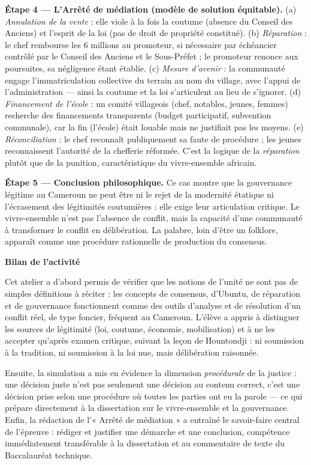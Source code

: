 \documentclass[11pt]{article}
\newcommand{\cle}[1]{{\popxbold\color{popdark}#1}}
\begin{document}
\begin{exoresolu}
\textbf{Étape 4 — L'Arrêté de médiation (modèle de solution équitable).} (a) \emph{Annulation de la vente} : elle viole à la fois la coutume (absence du Conseil des Anciens) et l'esprit de la loi (pas de droit de propriété constitué). (b) \emph{Réparation} : le chef rembourse les 6 millions au promoteur, si nécessaire par échéancier contrôlé par le Conseil des Anciens et le Sous-Préfet ; le promoteur renonce aux poursuites, sa négligence étant établie. (c) \emph{Mesure d'avenir} : la communauté engage l'immatriculation collective du terrain au nom du village, avec l'appui de l'administration — ainsi la coutume et la loi s'articulent au lieu de s'ignorer. (d) \emph{Financement de l'école} : un comité villageois (chef, notables, jeunes, femmes) recherche des financements transparents (budget participatif, subvention communale), car la fin (l'école) était louable mais ne justifiait pas les moyens. (e) \emph{Réconciliation} : le chef reconnaît publiquement sa faute de procédure ; les jeunes reconnaissent l'autorité de la chefferie réformée. C'est la logique de la \emph{réparation} plutôt que de la punition, caractéristique du vivre-ensemble africain.

\textbf{Étape 5 — Conclusion philosophique.} Ce cas montre que la gouvernance légitime au Cameroun ne peut être ni le rejet de la modernité étatique ni l'écrasement des légitimités coutumières : elle exige leur articulation critique. Le vivre-ensemble n'est pas l'absence de conflit, mais la capacité d'une communauté à transformer le conflit en délibération. La palabre, loin d'être un folklore, apparaît comme une procédure rationnelle de production du consensus.
\end{exoresolu}

\textbf{Bilan de l'activité}

Cet atelier a d'abord permis de vérifier que les notions de l'unité ne sont pas de simples définitions à réciter : les concepts de \cle{consensus}, d'\cle{Ubuntu}, de \cle{réparation} et de \cle{gouvernance} fonctionnent comme des outils d'analyse et de résolution d'un conflit réel, de type foncier, fréquent au Cameroun. L'élève a appris à distinguer les sources de légitimité (loi, coutume, économie, mobilisation) et à ne les accepter qu'après examen critique, suivant la leçon de Hountondji : ni soumission à la tradition, ni soumission à la loi nue, mais délibération raisonnée.

Ensuite, la simulation a mis en évidence la dimension \emph{procédurale} de la justice : une décision juste n'est pas seulement une décision au contenu correct, c'est une décision prise selon une procédure où toutes les parties ont eu la parole — ce qui prépare directement à la dissertation sur le vivre-ensemble et la gouvernance. Enfin, la rédaction de l'« Arrêté de médiation » a entraîné le savoir-faire central de l'épreuve : \cle{rédiger et justifier} une démarche et une conclusion, compétence immédiatement transférable à la dissertation et au commentaire de texte du Baccalauréat technique.
\end{document}
